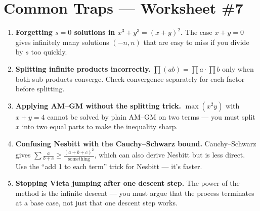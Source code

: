 \documentclass[11pt,a4paper]{article}
\begin{document}
\section*{Common Traps --- Worksheet \#7}
\begin{enumerate}[leftmargin=2em,itemsep=4pt]
  \item \textbf{Forgetting $s=0$ solutions in $x^3+y^3=(x+y)^2$.} The case $x+y=0$ gives infinitely many solutions $(-n,n)$ that are easy to miss if you divide by $s$ too quickly. 
  \item \textbf{Splitting infinite products incorrectly.} $\prod(ab)=\prod a\cdot\prod b$ only when both sub-products converge. Check convergence separately for each factor before splitting. 
  \item \textbf{Applying AM--GM without the splitting trick.} $\max(x^2y)$ with $x+y=4$ cannot be solved by plain AM--GM on two terms --- you must split $x$ into two equal parts to make the inequality sharp. 
  \item \textbf{Confusing Nesbitt with the Cauchy--Schwarz bound.} Cauchy--Schwarz gives $\sum\frac{a}{b+c}\geq\frac{(a+b+c)^2}{\text{something}}$, which can also derive Nesbitt but is less direct. Use the ``add 1 to each term'' trick for Nesbitt --- it's faster. 
  \item \textbf{Stopping Vieta jumping after one descent step.} The power of the method is the infinite descent --- you must argue that the process terminates at a base case, not just that one descent step works. 
\end{enumerate}

\end{document}

